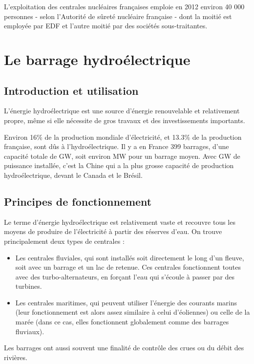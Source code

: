 \documentclass[12pt,a4paper,oneside,openany]{memoir}
\begin{document}
L'exploitation des centrales nucléaires françaises emploie en 2012 environ 40 000 personnes - selon l'Autorité de sûreté nucléaire française - dont la moitié est employée par EDF et l'autre moitié par des sociétés sous-traitantes.








\chapter{Le barrage hydroélectrique}

\section{Introduction et utilisation}
L'énergie hydroélectrique est une source d'énergie renouvelable et relativement propre, même si elle nécessite de gros travaux et des investissements importants.

Environ 16\% de la production mondiale d'électricité, et 13.3\% de la production française, sont dûs à l'hydroélectrique. Il y a en France 399 barrages, d'une capacité totale de \unit[25]{GW}, soit environ \unit[62]{MW} pour un barrage moyen. Avec \unit[196]{GW} de puissance installée, c'est la Chine qui a la plus grosse capacité de production hydroélectrique, devant le Canada et le Brésil. 

\section{Principes de fonctionnement}
Le terme d'énergie hydroélectrique est relativement vaste et recouvre tous les moyens de produire de l'électricité à partir des réserves d'eau. On trouve principalement deux types de centrales :
\begin{itemize}
	\item Les centrales fluviales, qui sont installés soit directement le long d'un fleuve, soit avec un barrage et un lac de retenue. Ces centrales fonctionnent toutes avec des turbo-alternateurs, en forçant l'eau qui s'écoule à passer par des turbines.
	\item Les centrales maritimes, qui peuvent utiliser l'énergie des courants marins (leur fonctionnement est alors assez similaire à celui d'éoliennes) ou celle de la marée (dans ce cas, elles fonctionnent globalement comme des barrages fluviaux).
\end{itemize}

Les barrages ont aussi souvent une finalité de contrôle des crues ou du débit des rivières.
\end{document}
